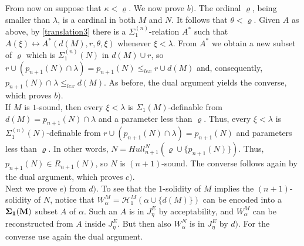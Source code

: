 \documentclass[12pt]{article}
\begin{document}
From now on suppose that $\kappa < \varrho$.  We now prove $b)$.  The ordinal $\varrho$, being smaller than $\lambda$, is a cardinal in both $M$ and $N$.  It follows that $\theta < \varrho$.  Given $A$ as above, by \ref{translation3} there is a $\Sigma_1^{(n)}$-relation $A^*$ such that $A(\xi) \leftrightarrow A^* ( d (M) , r , \theta , \xi )$ whenever $\xi < \lambda$.  From $A^*$ we obtain a new subset of $\varrho$ which is $\Sigma_1^{(n)}(N)$ in $d (M) \cup r$, so $r \cup (p_{n+1} (N) \cap \lambda) = p_{n+1} (N) \leq_{lex} r \cup d (M)$ and, consequently, $p_{n+1} (N) \cap \lambda \leq_{lex} d (M)$.  As before, the dual argument yields the converse, which proves $b)$.\\

If $M$ is $1$-sound, then every $\xi < \lambda$ is $\Sigma_1 (M)$-definable from $d(M) = p_{n+1} (N) \cap \lambda$ and a parameter less than $\varrho$.  Thus, every $\xi < \lambda$ is $\Sigma_1^{(n)}(N)$-definable from $r \cup (p_{n+1} (N) \cap \lambda) = p_{n+1}(N)$ and parameters less than $\varrho$.  In other words, $N = Hull_{n+1}^N ( \varrho \cup \{ p_{n+1} (N) \} )$.  Thus, $p_{n+1} (N) \in R_{n+1}(N)$, so $N$ is $(n + 1)$-sound.  The converse follows again by the dual argument, which proves $c)$.\\

Next we prove $e)$ from $d)$.  To see that the $1$-solidity of $M$ implies the $(n+1)$-solidity of $N$, notice that $W_{\alpha}^M = \mathcal{H}_1^M (\alpha \cup \{ d(M) \} )$ can be encoded into a $\bf{\Sigma_1} (M)$ subset $A$ of $\alpha$.  Such an $A$ is in $J_{\eta}^E$ by acceptability, and $W_{\alpha}^M$ can be reconstructed from $A$ inside $J_{\eta}^E$.  But then also $W_{\alpha}^N$ is in $J_{\eta}^E$ by $d)$.  For the converse use again the dual argument.\\
\end{document}
